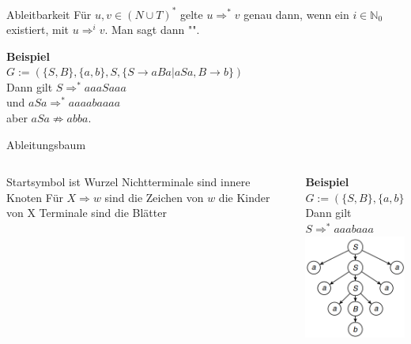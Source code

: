 \begin{frame}\bp
	\begin{block}{Ableitbarkeit}
		Für $u,v \in (N \cup T)^*$ gelte $u \Rightarrow^* v$ \ip genau dann, wenn ein $i \in \mathbb{N}_0$ existiert\ip , mit $u \Rightarrow^i v$. \ip Man sagt dann "".
	\end{block}\bp
	\textbf{Beispiel}\\
	$G:= (\{S,B\}, \{a,b\}, S, \{S \rightarrow aBa|aSa, B \rightarrow b\})$\\
	\ip Dann gilt $S \Rightarrow^* aaaSaaa$ \ip \\
	und $aSa \Rightarrow^* aaaabaaaa$ \ip \\
	aber $aSa \not\Rightarrow abba$.
\end{frame}

\begin{frame}{Ableitungsbaum}
	\begin{columns}
		\begin{column}{0.5\textwidth}
			\begin{itemize}
				\pitem Startsymbol ist Wurzel
				\pitem Nichtterminale sind innere Knoten
				\pitem Für $X \Rightarrow w $ sind die Zeichen von $w$ die Kinder von X
				\pitem Terminale sind die Blätter
			\end{itemize}
		\end{column}
		
		\begin{column}{0.5\textwidth}\bp
			\textbf{Beispiel}\\
			$G:= (\{S,B\}, \{a,b\}, S, \{S \rightarrow aBa|aSa, B \rightarrow b\})$\bp\\
			Dann gilt $S \Rightarrow^* aaabaaa$\\
			\center \includegraphics[scale=0.7]{images/Ableitungsbaum.png}
		\end{column}
	\end{columns}
	
\end{frame}

